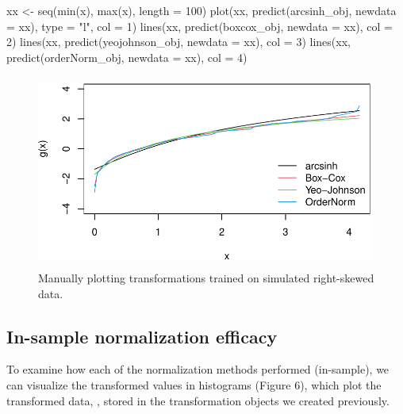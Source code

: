 \begin{Schunk}
\begin{Sinput}
xx <- seq(min(x), max(x), length = 100)
plot(xx, predict(arcsinh_obj, newdata = xx), type = "l", col = 1)
lines(xx, predict(boxcox_obj, newdata = xx), col = 2)
lines(xx, predict(yeojohnson_obj, newdata = xx), col = 3)
lines(xx, predict(orderNorm_obj, newdata = xx), col = 4)
\end{Sinput}
\end{Schunk}

\begin{Schunk}
\begin{figure}

{\centering \includegraphics[width=4.375in,height=2.5in]{figs/vis_data2-1} 

}

\caption[Manually plotting transformations trained on simulated right-skewed data]{Manually plotting transformations trained on simulated right-skewed data.}\label{fig:vis_data2}
\end{figure}
\end{Schunk}

\hypertarget{in-sample-normalization-efficacy}{%
\subsection{In-sample normalization
efficacy}\label{in-sample-normalization-efficacy}}

To examine how each of the normalization methods performed (in-sample),
we can visualize the transformed values in histograms (Figure 6), which
plot the transformed data, , stored in the transformation
objects we created previously.

